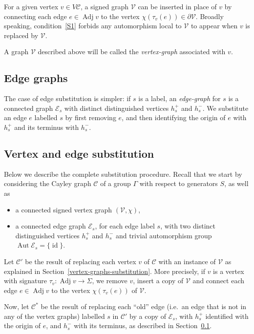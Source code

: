 \documentclass[10pt,a4paper]{amsart}
\newcommand{\ie}{i.e.\ }
\theoremstyle{definition}
\newcommand{\cC}{\mathcal{C}}
\newcommand{\cV}{\mathcal{V}}
\newcommand{\cE}{\mathcal{E}}
\DeclareMathOperator{\aut}{Aut}
\DeclareMathOperator{\adj}{Adj}
\DeclareMathOperator{\id}{id}
\begin{document}
For a given vertex $v \in V\cC$, a signed graph $\cV$ can be inserted in place of $v$ by connecting each edge $e \in \adj v$ to the vertex ${\chi}({\tau}_v(e)) \in {\partial}\cV$. Broadly speaking, condition~\ref{S1} forbids any automorphism local to $\cV$ to appear when $v$ is replaced by $\cV$.

A graph $\cV$ described above will be called the \emph{vertex-graph} associated with $v$.

\subsection{Edge graphs}\label{edge-graphs-substitution}

The case of edge substitution is simpler: if $s$ is a label, an \emph{edge-graph} for $s$ is a connected graph $\cE_s$ with distinct distinguished vertices $h^{+}_s$ and $h^{-}_s$. We substitute an edge $e$ labelled $s$ by first removing $e$, and then identifying the origin of $e$ with $h^{+}_s$ and its terminus with $h^{-}_s$.

\subsection{Vertex and edge substitution}\label{sssection:substitution}
 
Below we describe the complete substitution procedure. Recall that we start by considering the Cayley graph $\cC$ of a group $\Gamma$ with respect to generators $S$, as well as 
\begin{itemize}
\item a connected signed vertex graph $(\cV,{\chi})$, 
\item a connected edge graph $\cE_s$, for each edge label $s$, with two distinct distinguished vertices $h_s^{+}$ and $h_s^{-}$ and trivial automorphism group $\aut \cE_s = \{\id \}$.
\end{itemize}
 
Let $\cC'$ be the result of replacing each vertex $v$ of $\cC$ with an instance of $\cV$ as explained in Section~\ref{vertex-graphs-substitution}. More precisely, if $v$ is a vertex with signature ${\tau}_v:\adj v \to {\Sigma}$, we remove $v$, insert a copy of $\cV$ and connect each edge $e\in \adj v$ to the vertex ${\chi}({\tau}_v(e))$ of $\cV$.

Now, let $\cC^*$ be the result of replacing each ``old'' edge (\ie an edge that is not in any of the vertex graphs) labelled $s$ in $\cC'$ by a copy of $\cE_s$, with $h_s^{+}$ identified with the origin of $e$, and $h_s^{-}$ with its terminus, as described in Section~\ref{edge-graphs-substitution}.
\end{document}
